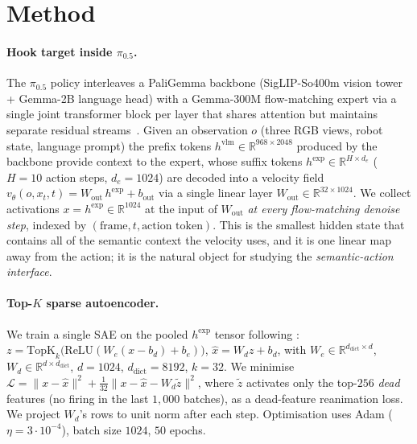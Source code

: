 \section{Method}
\label{sec:method}

\paragraph{Hook target inside $\pi_{0.5}$.}
The $\pi_{0.5}$ policy interleaves a PaliGemma backbone (SigLIP-So400m vision
tower + Gemma-2B language head) with a Gemma-300M flow-matching expert via a
single joint transformer block per layer that shares attention but maintains
separate residual streams~\citep{black2025pi05}. Given an observation $o$
(three RGB views, robot state, language prompt) the prefix tokens
$h^\text{vlm}\in\mathbb{R}^{968\times 2048}$ produced by the backbone provide
context to the expert, whose suffix tokens
$h^\text{exp}\in\mathbb{R}^{H\times d_e}$ ($H{=}10$ action steps,
$d_e{=}1024$) are decoded into a velocity field
$v_\theta(o, x_t, t) = W_\text{out}\,h^\text{exp} + b_\text{out}$ via a single
linear layer $W_\text{out}\in\mathbb{R}^{32\times 1024}$. We collect activations
$x = h^\text{exp} \in \mathbb{R}^{1024}$ at the input of $W_\text{out}$
\emph{at every flow-matching denoise step}, indexed by $(\text{frame}, t,
\text{action token})$. This is the smallest hidden state that contains all of
the semantic context the velocity uses, and it is one linear map away from the
action; it is the natural object for studying the
\emph{semantic-action interface}.

\paragraph{Top-$K$ sparse autoencoder.}
We train a single SAE on the pooled $h^\text{exp}$ tensor following
\citet{gao2024scaling}: $z = \mathrm{TopK}_k\!\bigl(\mathrm{ReLU}(W_e(x-b_d)+b_e)\bigr)$,
$\hat x = W_d z + b_d$, with $W_e\in\mathbb{R}^{d_\text{dict}\times d}$,
$W_d\in\mathbb{R}^{d\times d_\text{dict}}$, $d{=}1024$, $d_\text{dict}{=}8192$,
$k{=}32$. We minimise
$\mathcal L = \|x-\hat x\|^2 + \tfrac{1}{32}\|x-\hat x - W_d \tilde z\|^2$,
where $\tilde z$ activates only the top-$256$ \emph{dead} features (no firing in
the last $1{,}000$ batches), as a dead-feature reanimation loss. We project
$W_d$'s rows to unit norm after each step. Optimisation uses Adam ($\eta{=}3{\cdot}10^{-4}$),
batch size $1024$, $50$ epochs.

